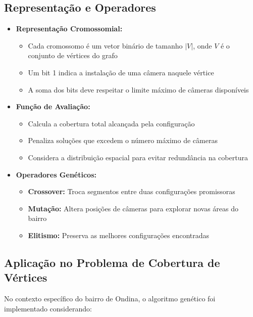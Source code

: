\documentclass[12pt, a4paper]{report}
\begin{document}
\subsection{Representação e Operadores}
\begin{itemize}
    \item \textbf{Representação Cromossomial:}
    \begin{itemize}
        \item Cada cromossomo é um vetor binário de tamanho \(\lvert V \rvert\), onde \(V\) é o conjunto de vértices do grafo
        \item Um bit 1 indica a instalação de uma câmera naquele vértice
        \item A soma dos bits deve respeitar o limite máximo de câmeras disponíveis
    \end{itemize}
    
    \item \textbf{Função de Avaliação:}
    \begin{itemize}
        \item Calcula a cobertura total alcançada pela configuração
        \item Penaliza soluções que excedem o número máximo de câmeras
        \item Considera a distribuição espacial para evitar redundância na cobertura
    \end{itemize}
    
    \item \textbf{Operadores Genéticos:}
    \begin{itemize}
        \item \textbf{Crossover:} Troca segmentos entre duas configurações promissoras
        \item \textbf{Mutação:} Altera posições de câmeras para explorar novas áreas do bairro
        \item \textbf{Elitismo:} Preserva as melhores configurações encontradas
    \end{itemize}
\end{itemize}

\subsection{Aplicação no Problema de Cobertura de Vértices}
No contexto específico do bairro de Ondina, o algoritmo genético foi implementado considerando:
\end{document}
